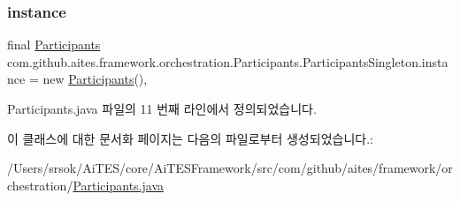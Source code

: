 \subsubsection{\texorpdfstring{instance}{instance}}
{\footnotesize\ttfamily final \mbox{\hyperlink{classcom_1_1github_1_1aites_1_1framework_1_1orchestration_1_1_participants}{Participants}} com.\+github.\+aites.\+framework.\+orchestration.\+Participants.\+Participants\+Singleton.\+instance = new \mbox{\hyperlink{classcom_1_1github_1_1aites_1_1framework_1_1orchestration_1_1_participants}{Participants}}()\hspace{0.3cm}{\ttfamily [static]}, {\ttfamily [private]}}



Participants.\+java 파일의 11 번째 라인에서 정의되었습니다.



이 클래스에 대한 문서화 페이지는 다음의 파일로부터 생성되었습니다.\+:\begin{DoxyCompactItemize}
\item 
/\+Users/srsok/\+Ai\+T\+E\+S/core/\+Ai\+T\+E\+S\+Framework/src/com/github/aites/framework/orchestration/\mbox{\hyperlink{_participants_8java}{Participants.\+java}}\end{DoxyCompactItemize}
